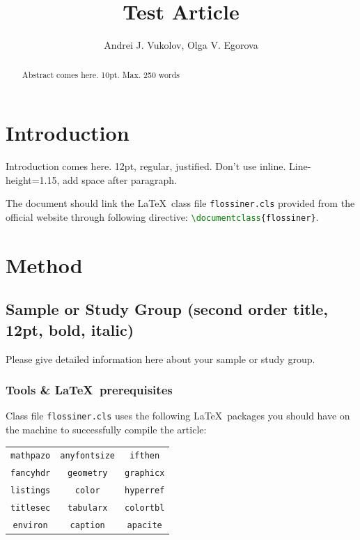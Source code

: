 \documentclass{flossiner}
\title{Test Article}
\author{Andrei J. Vukolov\affiliation{BMSTU}, Olga V. Egorova\affiliation{BMS}}
\begin{document}
    \maketitle
    \begin{abstract}
    	Abstract comes here. 10pt. Max. 250 words\hspace*{\fill}
    \end{abstract}

\section{Introduction}
Introduction comes here. 12pt, regular, justified. Don’t use inline. Line-height=1.15, add space after paragraph. 

The document should link the \LaTeX\ class file \texttt{flossiner.cls} provided from the official website through following directive: \lstinline[language=TeX]|\documentclass{flossiner}|.

\section{Method}
\subsection{Sample or Study Group (second order title, 12pt, bold, italic)}
Please give detailed information here about your sample or study group.

\subsubsection{Tools \& \LaTeX\ prerequisites}
Class file \texttt{flossiner.cls} uses the following \LaTeX\ packages you should have on the machine to successfully compile the article:

	\begin{tabular}{ccc}
		\texttt{mathpazo}	&	\texttt{anyfontsize}	&	\texttt{ifthen}		\\
		\texttt{fancyhdr}	&	\texttt{geometry}		&	\texttt{graphicx}	\\
		\texttt{listings}	&	\texttt{color}			&	\texttt{hyperref}	\\
		\texttt{titlesec}	&	\texttt{tabularx}		&	\texttt{colortbl}	\\
		\texttt{environ}	&	\texttt{caption}		&	\texttt{apacite}
	\end{tabular}
\end{document}
